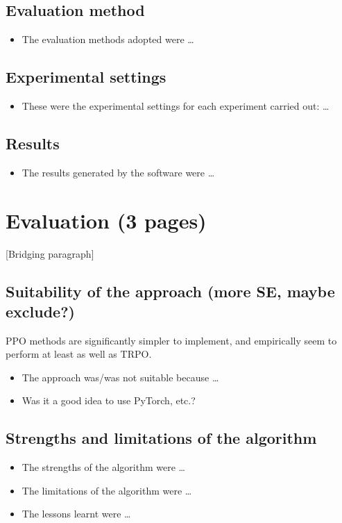 \documentclass[12pt,a4paper]{article}
\begin{document}
\subsection{Evaluation method}
\begin{itemize}
    \item The evaluation methods adopted were \dots
\end{itemize}

\subsection{Experimental settings}
\begin{itemize}
    \item These were the experimental settings for each experiment carried out: \dots
\end{itemize}

\subsection{Results}
\begin{itemize}
    \item The results generated by the software were \dots
\end{itemize}

\newpage
\section{Evaluation (3 pages)}
[Bridging paragraph]
\subsection{Suitability of the approach (more SE, maybe exclude?)}
PPO methods are significantly simpler to implement, and empirically seem to perform at least as well as TRPO.
\begin{itemize}
    \item The approach was/was not suitable because \dots
    \item Was it a good idea to use PyTorch, etc.?
\end{itemize}

\subsection{Strengths and limitations of the algorithm} 
\begin{itemize}
    \item The strengths of the algorithm were \dots
    \item The limitations of the algorithm were \dots
    \item The lessons learnt were \dots
\end{itemize}
\end{document}
